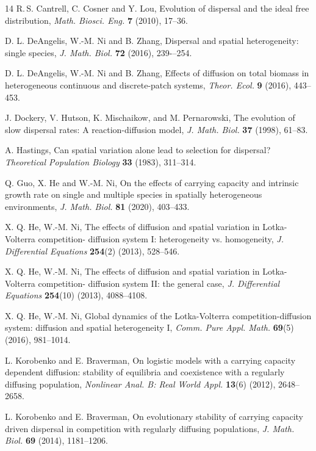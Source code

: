 \documentclass[11pt]{article}
\theoremstyle{definition}
\theoremstyle{remark}
\begin{document}
\begin{thebibliography}{14}
R.\,S. Cantrell, C. Cosner and Y. Lou, 
Evolution of dispersal and the ideal free
distribution, {\em Math. Biosci. Eng.} {\bf 7} (2010),
17--36.

D. L. DeAngelis, W.-M. Ni and B. Zhang, 
Dispersal and spatial heterogeneity: single species, 
{\em J. Math. Biol.} {\bf 72} (2016), %
239-–254. 

D. L. DeAngelis, W.-M. Ni and B. Zhang, 
Effects of diffusion on total biomass in heterogeneous continuous
and discrete-patch systems, 
{\em Theor. Ecol.} {\bf 9} (2016), 443--453.

J. Dockery, V. Hutson, K. Mischaikow, and M. Pernarowski, The evolution of slow dispersal rates: A reaction-diffusion
model, {\em J. Math. Biol.} {\bf  37}  (1998),  61--83.

A. Hastings, Can spatial variation alone lead to selection for dispersal? {\em Theoretical Population
Biology} {\bf 33}  (1983), 311--314.

Q. Guo, X. He and  W.-M. Ni,
On the effects of carrying capacity and intrinsic growth rate
on single and multiple species in spatially heterogeneous
environments,
{\em J. Math. Biol.}  {\bf  81} (2020), 403--433.

X. Q. He, W.-M. Ni, The effects of diffusion and spatial variation in Lotka-Volterra competition- diffusion system I:
heterogeneity vs. homogeneity, {\em J. Differential Equations} {\bf  254}(2) (2013), 528--546.

X. Q. He, W.-M. Ni, The effects of diffusion and spatial variation in Lotka-Volterra competition- diffusion system
II: the general case, {\em J. Differential Equations} {\bf  254}(10) (2013), 4088--4108.

X. Q. He, W.-M. Ni, Global dynamics of the Lotka-Volterra competition-diffusion system: diffusion and spatial
heterogeneity I, {\em Comm. Pure Appl. Math.} {\bf  69}(5) (2016), 981--1014.

L. Korobenko and E. Braverman, On logistic models with a carrying capacity dependent diffusion: 
stability of equilibria and coexistence with a regularly diffusing population, 
{\em Nonlinear Anal. B: Real World Appl.} {\bf 13}(6) (2012), 2648--2658.

L. Korobenko and E. Braverman, 
On evolutionary stability of carrying capacity driven dispersal in competition with regularly diffusing populations, 
{\em J. Math. Biol.} {\bf 69} (2014), 1181--1206.


\end{thebibliography}
\end{document}
